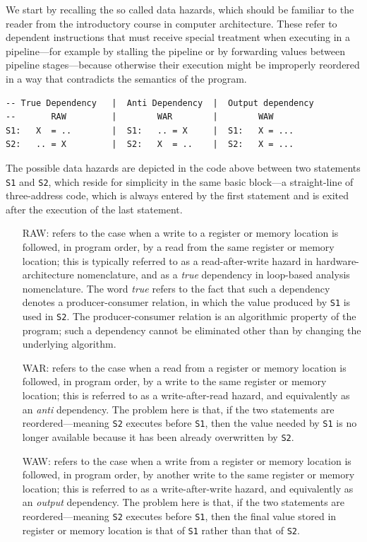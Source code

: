 \documentclass[acmsmall,review]{acmart}\settopmatter{printfolios=true,printccs=false,printacmref=false}
\begin{document}
We start by recalling the so called data hazards, which should
be familiar to the reader from the introductory course in 
computer architecture. These refer to dependent instructions
that must receive special treatment when executing in a 
pipeline---for example by stalling the pipeline or by forwarding 
values between pipeline stages---because otherwise their execution
might be improperly reordered in a way that contradicts the
semantics of the program.   

\begin{lstlisting}[mathescape=true]
-- True Dependency   |  Anti Dependency  |  Output dependency
--       RAW         |        WAR        |        WAW
S1:   X  = ..        |  S1:   .. = X     |  S1:   X = ...            
S2:   .. = X         |  S2:   X  = ..    |  S2:   X = ...
\end{lstlisting}\vspace{-2ex}

The possible data hazards are depicted in the code above between
two statements {\tt S1} and {\tt S2}, which reside for simplicity
in the same basic block---a straight-line of three-address code, 
which is always entered by the first statement and is exited after 
the execution of the last statement. 
\begin{itemize}
    \item[RAW:] refers to the case when a write to a register or
        memory location is followed, in program order, by a read
        from the same register or memory location; this is typically
        referred to as a read-after-write hazard in hardware-architecture
        nomenclature, and as a \emph{true} dependency in loop-based analysis
        nomenclature. The word \emph{true} refers to the fact that such 
        a dependency denotes a producer-consumer relation, in which
        the value produced by {\tt S1} is used in {\tt S2}. The 
        producer-consumer relation is an algorithmic property of the 
        program; such a dependency cannot be eliminated other than 
        by changing the underlying algorithm.
    \item[WAR:] refers to the case when a read from a register or
        memory location is followed, in program order, by a write to
        the same register or memory location; this is referred to
        as a write-after-read hazard, and equivalently as an
        \emph{anti} dependency. The problem here is that, if the
        two statements are reordered---meaning {\tt S2} executes
        before {\tt S1}, then the value needed by {\tt S1} is no
        longer available because it has been already overwritten
        by {\tt S2}.
    \item[WAW:] refers to the case when a write from a register or
        memory location is followed, in program order, by another
        write to the same register or memory location; this is
        referred to as a write-after-write hazard, and equivalently 
        as an \emph{output} dependency. The problem here is that, 
        if the two statements are reordered---meaning {\tt S2} executes
        before {\tt S1}, then the final value stored in register 
        or memory location is that of {\tt S1} rather than that of 
        {\tt S2}.
\end{itemize}
\end{document}
